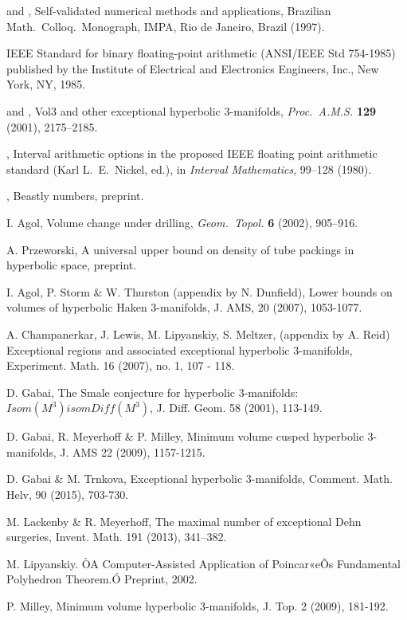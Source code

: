 \AuthorRefNames [CHGN]
\begin{references}

   and , Self-validated
numerical methods and applications, Brazilian Math.\  Colloq.\  Monograph, IMPA, Rio de Janeiro, Brazil (1997).
 
  IEEE Standard for binary floating-point arithmetic
(ANSI/IEEE Std 754-1985) published by the Institute of 
Electrical and Electronics Engineers, Inc., New York, NY, 1985.
 
   and , Vol3 and other exceptional 
hyperbolic $3$-manifolds,  {\it Proc.\ A.M.S.} {\bf 129}
(2001), 2175--2185.
 
   , Interval arithmetic options in the 
proposed IEEE floating point arithmetic standard (Karl L.\ E.\ Nickel,
ed.), in  
{\it Interval Mathematics\/}, 99--128 (1980). 
 
   \bibline, Beastly numbers, preprint.
 
 I. Agol, Volume change under drilling, {\it Geom.\ Topol.\/} {\bf 6} (2002), 905--916.

 A. Przeworski, A universal upper bound on density of tube packings in hyperbolic space,
preprint.

 I. Agol, P. Storm \& W. Thurston (appendix by N. Dunfield), Lower bounds on volumes of hyperbolic Haken 3-manifolds, J. AMS, 20 (2007), 1053-1077. 

 

 A. Champanerkar, J.  Lewis, M. Lipyanskiy, S. Meltzer, (appendix by A. Reid)
Exceptional regions and associated exceptional hyperbolic 3-manifolds, Experiment. Math. 16 (2007), no. 1, 107 - 118.

 D. Gabai, The Smale conjecture for hyperbolic 3-manifolds:  $Isom (M^3) isom Diff (M^3)$, J. Diff. Geom.  58 (2001), 113-149.


 D. Gabai, R. Meyerhoff \& P. Milley, Minimum volume cusped hyperbolic 3-manifolds, J. AMS 22 (2009), 1157-1215.

 D. Gabai \& M. Trnkova, Exceptional hyperbolic 3-manifolds, Comment. Math. Helv, 90 (2015), 703-730.

 M. Lackenby \& R. Meyerhoff, The maximal number of exceptional Dehn surgeries, Invent. Math. 191 (2013), 341--382.


 M. Lipyanskiy. ÒA Computer-Assisted Application
of Poincar«eÕs Fundamental Polyhedron Theorem.Ó
Preprint, 2002.

 P. Milley, Minimum volume hyperbolic 3-manifolds, J. Top. 2 (2009), 181-192.


\end{references}

 
